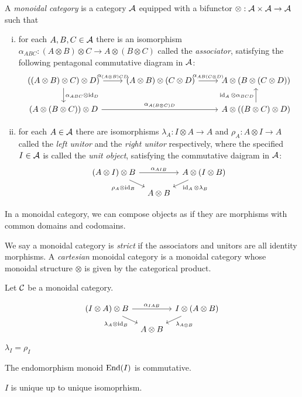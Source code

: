 \documentclass{../../large}
\begin{document}
\section{}

\begin{prb}
A \emph{monoidal category} is a category $\mathcal{A}$ equipped with a bifunctor $\otimes:\mathcal{A}\times\mathcal{A}\to\mathcal{A}$ such that
\begin{enumerate}[(i)]
\item for each $A,B,C\in\mathcal{A}$ there is an isomorphism $\alpha_{ABC}:(A\otimes B)\otimes C\to A\otimes(B\otimes C)$ called the \emph{associator}, satisfying the following pentagonal commutative diagram in $\mathcal{A}$:
\[\begin{tikzcd}
((A\otimes B)\otimes C)\otimes D) \rar{\alpha_{(A\otimes B)CD}} \dar{\alpha_{ABC}\otimes\id_D} &
(A\otimes B)\otimes(C\otimes D) \rar{\alpha_{AB(C\otimes D)}} &
A\otimes(B\otimes(C\otimes D))\\
(A\otimes(B\otimes C))\otimes D \ar{rr}{\alpha_{A(B\otimes C)D}} &&
A\otimes((B\otimes C)\otimes D) \uar{\id_A\otimes\alpha_{BCD}}
\end{tikzcd}\]
\item for each $A\in\mathcal{A}$ there are isomorphisms $\lambda_A:I\otimes A\to A$ and $\rho_A:A\otimes I\to A$ called the \emph{left unitor} and the \emph{right unitor} respectively, where the specified $I\in\mathcal{A}$ is called the \emph{unit object}, satisfying the commutative daigram in $\mathcal{A}$:
\[\begin{tikzcd}[row sep=small,column sep=tiny]
(A\otimes I)\otimes B \ar{rr}{\alpha_{AIB}} \ar[swap]{dr}{\rho_A\otimes\id_B} &&
A\otimes(I\otimes B) \ar{dl}{\id_A\otimes\lambda_B}\\
& A\otimes B &
\end{tikzcd}\]
\end{enumerate}
In a monoidal category, we can compose objects as if they are morphisms with common domains and codomains.

We say a monoidal category is \emph{strict} if the associators and unitors are all identity morphisms.
A \emph{cartesian} monoidal category is a monoidal category whose monoidal structure $\otimes$ is given by the categorical product.
\end{prb}


\begin{prb}
Let $\mathcal{C}$ be a monoidal category.
\begin{parts}
\item
\[\begin{tikzcd}[row sep=small,column sep=tiny]
(I\otimes A)\otimes B \ar{rr}{\alpha_{IAB}} \ar[swap]{dr}{\lambda_A\otimes\id_B} &&
I\otimes(A\otimes B) \ar{dl}{\lambda_{A\otimes B}}\\
& A\otimes B &
\end{tikzcd}\]
\item $\lambda_I=\rho_I$
\item The endomorphism monoid $\operatorname{End}(I)$ is commutative.
\item $I$ is unique up to unique isomoprhism.
\end{parts}
\end{prb}
\end{document}
